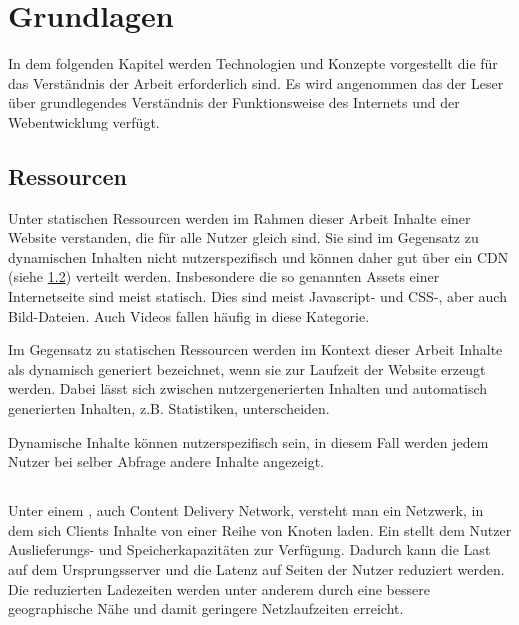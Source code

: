 \chapter{Grundlagen}\label{ch:related_work}
In dem folgenden Kapitel werden Technologien und Konzepte vorgestellt die für das  Verständnis der Arbeit erforderlich sind. Es wird angenommen das der Leser über grundlegendes Verständnis der Funktionsweise des Internets und der Webentwicklung verfügt.

\section{Ressourcen}
Unter statischen Ressourcen werden im Rahmen dieser Arbeit Inhalte einer Website verstanden, die für alle Nutzer gleich sind. Sie sind im Gegensatz zu dynamischen Inhalten nicht nutzerspezifisch und können daher gut über ein CDN (siehe \ref{cdn}) verteilt werden. Insbesondere die so genannten Assets einer Internetseite sind meist statisch. Dies sind meist Javascript- und CSS-, aber auch Bild-Dateien. Auch Videos fallen häufig in diese Kategorie.


Im Gegensatz zu statischen Ressourcen werden im Kontext dieser Arbeit Inhalte als dynamisch generiert bezeichnet, wenn sie zur Laufzeit der Website erzeugt werden. Dabei lässt sich zwischen nutzergenerierten Inhalten und automatisch generierten Inhalten, z.B. Statistiken, unterscheiden.

Dynamische Inhalte können nutzerspezifisch sein, in diesem Fall werden jedem Nutzer bei selber Abfrage andere Inhalte angezeigt.

\section{\cdn} \label{cdn}
Unter einem \cdn, auch Content Delivery Network, versteht man ein Netzwerk, in dem sich Clients Inhalte von einer Reihe von Knoten laden. Ein \cdn stellt dem Nutzer Auslieferungs- und Speicherkapazitäten zur Verfügung. Dadurch kann die Last auf dem Ursprungsserver und die Latenz auf Seiten der Nutzer reduziert werden. Die reduzierten Ladezeiten werden unter anderem durch eine bessere geographische Nähe und damit geringere Netzlaufzeiten erreicht.

